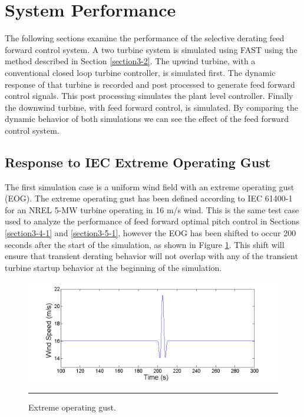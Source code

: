 
\section{System Performance} \label{section4-6}

The following sections examine the performance of the selective derating feed forward control system. A two turbine system is simulated using FAST using the method described in Section \ref{section3-2}. The upwind turbine, with a conventional closed loop turbine controller,  is simulated first. The dynamic response of that turbine is recorded and post processed to generate feed forward control signals. This post processing simulates the plant level controller. Finally the downwind turbine, with feed forward control, is simulated. By comparing the dynamic behavior of both simulations we can see the effect of the feed forward control system.

\subsection{Response to IEC Extreme Operating Gust} \label{section4-6-1}

The first simulation case is a uniform wind field with an extreme operating gust (EOG). The extreme operating gust has been defined according to IEC 61400-1 \cite{IEC2005} for an NREL 5-MW turbine operating in 16 m/s wind. This is the same test case used to analyze the performance of feed forward optimal pitch control in Sections \ref{section3-4-1} and \ref{section3-5-1}, however the EOG has been shifted to occur 200 seconds after the start of the simulation, as shown in Figure \ref{fig4-22}. This shift will ensure that transient derating behavior will not overlap with any of the transient turbine startup  behavior at the beginning of the simulation.

\begin{figure}[htbp]
	\centering
		\includegraphics[trim = {1cm 0 2cm 0}, clip, width = \linewidth]{Figures/ch4Figures/fig4-22.png}
		\rule{35em}{0.5pt}
	\caption{Extreme operating gust.}
	\label{fig4-22}
\end{figure}

